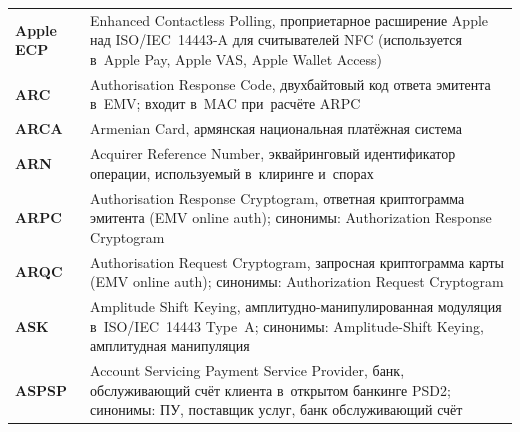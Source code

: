 \begin{longtable}{@{}p{4.5em}p{\dimexpr\linewidth-4.5em-2\tabcolsep\relax}@{}}
  \textbf{Apple ECP}         & Enhanced Contactless Polling, проприетарное расширение Apple над ISO/IEC~14443-A для считывателей NFC (используется в~Apple Pay, Apple VAS, Apple Wallet Access)                                                                                                                                 \\
  \textbf{ARC}               & Authorisation Response Code, двухбайтовый код ответа эмитента в~EMV; входит в~MAC при~расчёте ARPC                                                                                                                                                                                              \\
  \textbf{ARCA}              & Armenian Card, армянская национальная платёжная система                                                                                                                                                                                                                                          \\
  \textbf{ARN}               & Acquirer Reference Number, эквайринговый идентификатор операции, используемый в~клиринге и~спорах                                                                                                                                                                                                \\
  \textbf{ARPC}              & Authorisation Response Cryptogram, ответная криптограмма эмитента (EMV online auth); синонимы: Authorization Response Cryptogram                                                                                                                                                                  \\
  \textbf{ARQC}              & Authorisation Request Cryptogram, запросная криптограмма карты (EMV online auth); синонимы: Authorization Request Cryptogram                                                                                                                                                                      \\
  \textbf{ASK}               & Amplitude Shift Keying, амплитудно-манипулированная модуляция в~ISO/IEC~14443 Type~A; синонимы: Amplitude-Shift Keying, амплитудная манипуляция                                                                                                                                                  \\
  \textbf{ASPSP}             & Account Servicing Payment Service Provider, банк, обслуживающий счёт клиента в~открытом банкинге PSD2; синонимы: ПУ, поставщик услуг, банк обслуживающий счёт                                                                                                                                    \\

\end{longtable}
